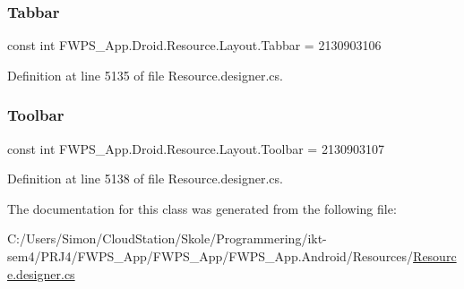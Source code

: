 \mbox{\label{class_f_w_p_s___app_1_1_droid_1_1_resource_1_1_layout_ad05187860cb9299798c7452472bdb9f7}} 
\subsubsection{\texorpdfstring{Tabbar}{Tabbar}}
{\footnotesize\ttfamily const int F\+W\+P\+S\+\_\+\+App.\+Droid.\+Resource.\+Layout.\+Tabbar = 2130903106}



Definition at line 5135 of file Resource.\+designer.\+cs.

\mbox{\label{class_f_w_p_s___app_1_1_droid_1_1_resource_1_1_layout_a709350f8bf469c079d83d08e567bd237}} 
\subsubsection{\texorpdfstring{Toolbar}{Toolbar}}
{\footnotesize\ttfamily const int F\+W\+P\+S\+\_\+\+App.\+Droid.\+Resource.\+Layout.\+Toolbar = 2130903107}



Definition at line 5138 of file Resource.\+designer.\+cs.



The documentation for this class was generated from the following file\+:\begin{DoxyCompactItemize}
\item 
C\+:/\+Users/\+Simon/\+Cloud\+Station/\+Skole/\+Programmering/ikt-\/sem4/\+P\+R\+J4/\+F\+W\+P\+S\+\_\+\+App/\+F\+W\+P\+S\+\_\+\+App/\+F\+W\+P\+S\+\_\+\+App.\+Android/\+Resources/\mbox{\hyperlink{_resource_8designer_8cs}{Resource.\+designer.\+cs}}\end{DoxyCompactItemize}

